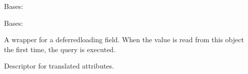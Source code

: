 \documentclass[letterpaper,10pt,english]{sphinxmanual}
\begin{document}
\begin{fulllineitems}
\begin{fulllineitems}
\end{fulllineitems}


\begin{fulllineitems}
\label{\detokenize{index:core.models.SwimmingPoolInfo.DoesNotExist}}
\pysigstartsignatures
\pysigline
{}
\pysigstopsignatures
\sphinxAtStartPar
Bases: 

\end{fulllineitems}


\begin{fulllineitems}
\label{\detokenize{index:core.models.SwimmingPoolInfo.MultipleObjectsReturned}}
\pysigstartsignatures
\pysigline
{}
\pysigstopsignatures
\sphinxAtStartPar
Bases: 

\end{fulllineitems}


\begin{fulllineitems}
\label{\detokenize{index:core.models.SwimmingPoolInfo.id}}
\pysigstartsignatures
\pysigline
{}
\pysigstopsignatures
\sphinxAtStartPar
A wrapper for a deferred\sphinxhyphen{}loading field. When the value is read from this
object the first time, the query is executed.

\end{fulllineitems}


\begin{fulllineitems}
\label{\detokenize{index:core.models.SwimmingPoolInfo.pool_opening_end}}
\pysigstartsignatures
\pysigline
{}
\pysigstopsignatures
\sphinxAtStartPar
Descriptor for translated attributes.


\end{fulllineitems}
\end{fulllineitems}
\end{document}
